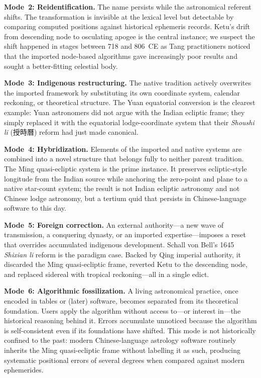\documentclass[10pt,a4paper]{article}
\newcommand{\zh}[1]{#1}
\begin{document}
\textbf{Mode~2: Reidentification.}  The name persists while the astronomical
referent shifts.  The transformation is invisible at the lexical level but
detectable by comparing computed positions against historical ephemeris records.
Ketu's drift from descending node to osculating apogee is the central instance;
we suspect the shift happened in stages between 718 and 806~CE as Tang
practitioners noticed that the imported node-based algorithms gave increasingly
poor results and sought a better-fitting celestial body.

\textbf{Mode~3: Indigenous restructuring.}  The native tradition actively
overwrites the imported framework by substituting its own coordinate system,
calendar reckoning, or theoretical structure.  The Yuan equatorial conversion
is the clearest example: Yuan astronomers did not argue with the Indian ecliptic
frame; they simply replaced it with the equatorial lodge-coordinate system that
their \textit{Shoushi li} (\zh{授時曆}) reform had just made canonical.

\textbf{Mode~4: Hybridization.}  Elements of the imported and native systems are
combined into a novel structure that belongs fully to neither parent tradition.
The Ming quasi-ecliptic system is the prime instance.  It preserves ecliptic-style
longitude from the Indian source while anchoring the zero-point and plane to a
native star-count system; the result is not Indian ecliptic astronomy and not
Chinese lodge astronomy, but a tertium quid that persists in Chinese-language
software to this day.

\textbf{Mode~5: Foreign correction.}  An external authority---a new wave of
transmission, a conquering dynasty, or an imported expertise---imposes a reset
that overrides accumulated indigenous development.  Schall von Bell's 1645
\textit{Shixian li} reform is the paradigm case.  Backed by Qing imperial
authority, it discarded the Ming quasi-ecliptic frame, reverted Ketu to the
descending node, and replaced sidereal with tropical reckoning---all in a single
edict.

\textbf{Mode~6: Algorithmic fossilization.}  A living astronomical practice,
once encoded in tables or (later) software, becomes separated from its theoretical
foundation.  Users apply the algorithm without access to---or interest in---the
historical reasoning behind it.  Errors accumulate unnoticed because the algorithm
is self-consistent even if its foundations have shifted.  This mode is not
historically confined to the past: modern Chinese-language astrology software
routinely inherits the Ming quasi-ecliptic frame without labelling it as such,
producing systematic positional errors of several degrees when compared against
modern ephemerides.
\end{document}
